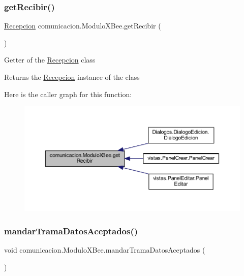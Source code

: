 \subsubsection{\texorpdfstring{get\+Recibir()}{getRecibir()}}
{\footnotesize\ttfamily \mbox{\hyperlink{classcomunicacion_1_1_recepcion}{Recepcion}} comunicacion.\+Modulo\+X\+Bee.\+get\+Recibir (\begin{DoxyParamCaption}{ }\end{DoxyParamCaption})}

Getter of the \mbox{\hyperlink{classcomunicacion_1_1_recepcion}{Recepcion}} class \begin{DoxyReturn}{Returns}
the \mbox{\hyperlink{classcomunicacion_1_1_recepcion}{Recepcion}} instance of the class 
\end{DoxyReturn}
Here is the caller graph for this function\+:
\nopagebreak
\begin{figure}[H]
\begin{center}
\leavevmode
\includegraphics[width=350pt]{classcomunicacion_1_1_modulo_x_bee_aa5c08aaaafb7b4dcb11fecb4fb47812f_icgraph}
\end{center}
\end{figure}
\mbox{\label{classcomunicacion_1_1_modulo_x_bee_a60d0556ad61da3b8f66d192779c70bd7}} 
\subsubsection{\texorpdfstring{mandar\+Trama\+Datos\+Aceptados()}{mandarTramaDatosAceptados()}}
{\footnotesize\ttfamily void comunicacion.\+Modulo\+X\+Bee.\+mandar\+Trama\+Datos\+Aceptados (\begin{DoxyParamCaption}{ }\end{DoxyParamCaption})}

